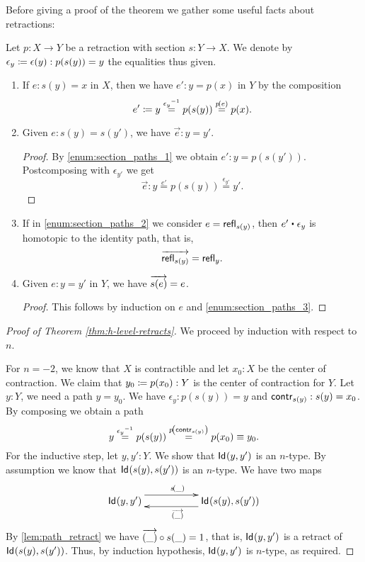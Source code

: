 Before giving a proof of the theorem we gather some useful facts about retractions:

\begin{lem}\label{lem:path_retract}
 Let $p \colon X \to Y$ be a retraction with section $s \colon Y \to X$.
 We denote by $\epsilon_y \defeq \epsilon(y) : p(s(y)) = y$ the equalities thus given.
 \begin{enumerate}
  \item \label{enum:section_paths_1}
      If $e : s(y) = x$ in $X$, then we have $e' :  y = p(x)$ in $Y$
        by the composition
     \[e' \defeq y \stackrel{\opp{\epsilon_y}}{=} p(s(y)) \stackrel{\map{p}{e}}{=} p(x)  .\]

  \item \label{enum:section_paths_2}
      Given $e : s(y) = s(y')$, we have $\vec e : y = y'$.
     \begin{proof}
	By \ref{enum:section_paths_1} we obtain $e' : y = p(s(y'))$.
        Postcomposing with $\epsilon_{y'}$ we get
           \[ \overrightarrow{e} : y \stackrel{e'}{=} p(s(y)) \stackrel{\epsilon_{y'}}{=} y'  . \]
     \end{proof}

  \item \label{enum:section_paths_3}
        If in \ref{enum:section_paths_2} we consider $e = \refl{s(y)}$, then $e' \ct \epsilon_{y}$
        is homotopic to the identity path, that is,
          \[ \overrightarrow{\refl{s(y)}} = \refl{y}  . \]

  \item Given $e : y = y'$ in $Y$, we have $\overrightarrow{\map{s}{e}} = e$.
      \begin{proof}
       This follows by induction on $e$ and \ref{enum:section_paths_3}.
      \end{proof}

 \end{enumerate}

\end{lem}


\begin{proof}[Proof of Theorem \autoref{thm:h-level-retracts}]
 We proceed by induction with respect to $n$.

 For $n=-2$, we know that $X$ is contractible and let $x_0 : X$ be the center of contraction.
 We claim that $y_0 \defeq p(x_0) : Y$ is the center of contraction for $Y$.
 Let $y : Y$, we need a path $y = y_0$. We have $\epsilon_y : p(s(y)) = y$ and $\contr_{s(y)} : s(y) = x_0$.
 By composing we obtain a path
 \[ y \stackrel{\opp{\epsilon_y}}{=} p(s(y)) \stackrel{\map{p}{\contr_{s(y)}}}{=} p(x_0) \equiv y_0  . \]
 For the inductive step, let $y, y' : Y$. We show that $\idtype {y}{y'}$ is an $n$-type.
 By assumption we know that $\idtype{s(y)}{s(y')}$ is an $n$-type.
 We have two maps
 \[\xymatrix{\idtype{y}{y'} \ar@<1.5ex>[rr]^{\map{s}{\_}} & & \idtype{s(y)}{s(y')} \ar@<1.2ex>[ll]^{\overrightarrow{(\_)}}}\]
  By \autoref{lem:path_retract} we have $\comp{\map{s}{\_}}{\overrightarrow{(\_)}} = 1$,
   that is, $\idtype {y}{y'}$ is a retract of $\idtype{s(y)}{s(y')}$.
    Thus, by induction hypothesis, $\idtype {y}{y'}$ is $n$-type, as required.
\end{proof}

